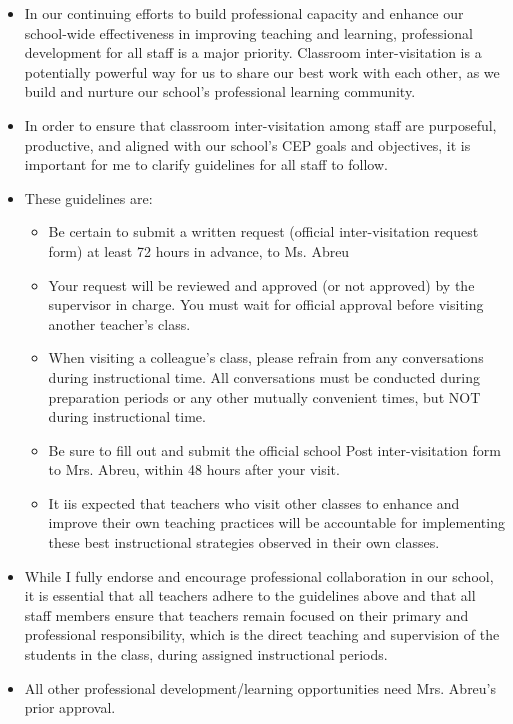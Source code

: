 \documentclass[11pt, letterpaper]{article}
\begin{document}
\begin{itemize}
    \item In our continuing efforts to build professional capacity and enhance our school-wide effectiveness in improving teaching and learning, professional development for all staff is a major priority.  Classroom inter-visitation is a potentially powerful way for us to share our best work with each other, as we build and nurture  our school’s professional learning community.
    \item In order to ensure that classroom inter-visitation among staff are purposeful, productive, and aligned with our school’s CEP goals and objectives, it is important for me to clarify guidelines for all staff to follow.
    \item These guidelines are:    
    \begin{itemize}
        \item Be certain to submit a written request (official inter-visitation request form) at least 72 hours in advance, to Ms. Abreu
        \item Your request will be reviewed and approved (or not approved) by the supervisor in charge. You must wait for official approval before visiting another teacher’s class.
        \item When visiting a colleague’s class, please refrain from any conversations during instructional time.  All conversations must be conducted during preparation periods or any other mutually convenient times, but NOT during instructional time. 
        \item Be sure to fill out and submit the official school Post inter-visitation form to Mrs. Abreu, within 48 hours after your visit.
        \item It iis expected that teachers who visit other classes to enhance and improve their own teaching practices will be accountable for implementing these best instructional strategies observed  in their own classes.
    \end{itemize}
    \item While I fully endorse and encourage professional collaboration in our school, it is essential that all teachers adhere to the guidelines above and that all staff members ensure that teachers remain focused on their primary and professional responsibility, which is the direct teaching and supervision of the students in the class, during assigned instructional periods.
    \item All other professional development/learning opportunities need Mrs. Abreu's prior approval.
\end{itemize}
\end{document}
